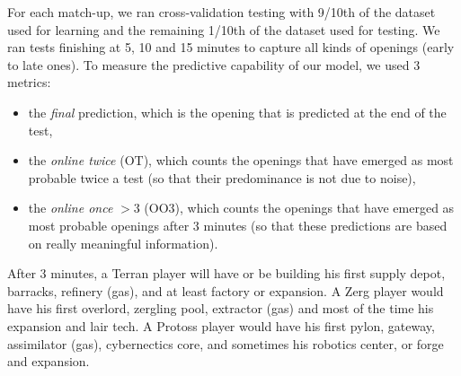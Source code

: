 For each match-up, we ran cross-validation testing with 9/10th of the dataset used for learning and the remaining 1/10th of the dataset used for testing. We ran tests finishing at 5, 10 and 15 minutes to capture all kinds of openings (early to late ones). To measure the predictive capability of our model, we used 3 metrics: 
\begin{itemize}
\item the \textit{final} prediction, which is the opening that is predicted at the end of the test, 
\item the \textit{online twice} (OT), which counts the openings that have emerged as most probable twice a test (so that their predominance is not due to noise),
\item the \textit{online once} $> 3$ (OO3), which counts the openings that have emerged as most probable openings after 3 minutes (so that these predictions are based on really meaningful information).
\end{itemize}
After 3 minutes, a Terran player will have or be building his first supply depot, barracks, refinery (gas), and at least factory or expansion. A Zerg player would have his first overlord, zergling pool, extractor (gas) and most of the time his expansion and lair tech. A Protoss player would have his first pylon, gateway, assimilator (gas), cybernectics core, and sometimes his robotics center, or forge and expansion.

